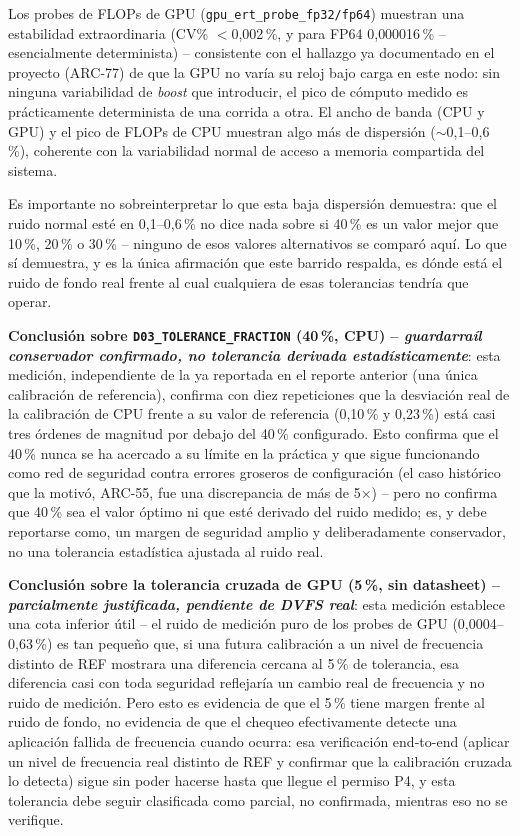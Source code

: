 Los probes de FLOPs de GPU (\texttt{gpu\_ert\_probe\_fp32/fp64}) muestran
una estabilidad extraordinaria (CV\% $<$0{,}002\,\%, y para FP64
0{,}000016\,\% -- esencialmente determinista) -- consistente con el
hallazgo ya documentado en el proyecto (ARC-77) de que la GPU no varía su
reloj bajo carga en este nodo: sin ninguna variabilidad de \textit{boost}
que introducir, el pico de cómputo medido es prácticamente determinista de
una corrida a otra. El ancho de banda (CPU y GPU) y el pico de FLOPs de CPU
muestran algo más de dispersión ($\sim$0{,}1--0{,}6\,\%), coherente con la
variabilidad normal de acceso a memoria compartida del sistema.

Es importante no sobreinterpretar lo que esta baja dispersión demuestra:
que el ruido normal esté en 0{,}1--0{,}6\,\% no dice nada sobre si 40\,\%
es un valor mejor que 10\,\%, 20\,\% o 30\,\% -- ninguno de esos valores
alternativos se comparó aquí. Lo que sí demuestra, y es la única
afirmación que este barrido respalda, es dónde está el ruido de fondo
real frente al cual cualquiera de esas tolerancias tendría que operar.

\textbf{Conclusión sobre \texttt{D03\_TOLERANCE\_FRACTION} (40\,\%, CPU)
-- \emph{guardarraíl conservador confirmado, no tolerancia derivada
estadísticamente}}: esta medición, independiente de la ya reportada en el
reporte anterior (una única calibración de referencia), confirma con diez
repeticiones que la desviación real de la calibración de CPU frente a su
valor de referencia (0{,}10\,\% y 0{,}23\,\%) está casi tres órdenes de
magnitud por debajo del 40\,\% configurado. Esto confirma que el 40\,\%
nunca se ha acercado a su límite en la práctica y que sigue funcionando
como red de seguridad contra errores groseros de configuración (el caso
histórico que la motivó, ARC-55, fue una discrepancia de más de
5$\times$) -- pero no confirma que 40\,\% sea el valor óptimo ni que esté
derivado del ruido medido; es, y debe reportarse como, un margen de
seguridad amplio y deliberadamente conservador, no una tolerancia
estadística ajustada al ruido real.

\textbf{Conclusión sobre la tolerancia cruzada de GPU (5\,\%, sin
datasheet) -- \emph{parcialmente justificada, pendiente de DVFS real}}:
esta medición establece una cota inferior útil -- el ruido de medición
puro de los probes de GPU (0{,}0004--0{,}63\,\%) es tan pequeño que, si una
futura calibración a un nivel de frecuencia distinto de REF mostrara una
diferencia cercana al 5\,\% de tolerancia, esa diferencia casi con toda
seguridad reflejaría un cambio real de frecuencia y no ruido de medición.
Pero esto es evidencia de que el 5\,\% tiene margen frente al ruido de
fondo, no evidencia de que el chequeo efectivamente detecte una aplicación
fallida de frecuencia cuando ocurra: esa verificación end-to-end (aplicar
un nivel de frecuencia real distinto de REF y confirmar que la calibración
cruzada lo detecta) sigue sin poder hacerse hasta que llegue el permiso
P4, y esta tolerancia debe seguir clasificada como parcial, no confirmada,
mientras eso no se verifique.
